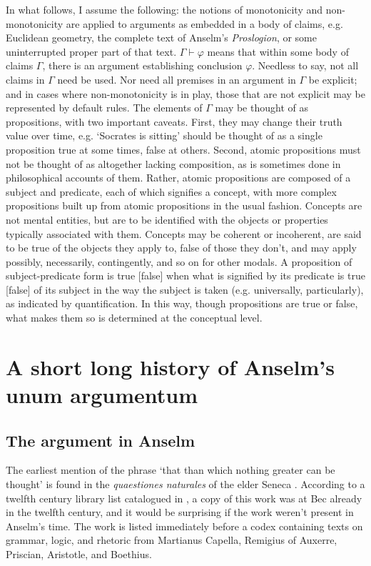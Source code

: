 \documentclass[]{amsart}
\begin{document}
In what follows, I assume the following: the notions of monotonicity and non-monotonicity are applied to arguments as embedded in a body of claims, e.g. Euclidean geometry, the complete text of Anselm's \textit{Proslogion}, or some uninterrupted proper part of that text. $\Gamma \vdash \varphi$ means that within some body of claims $\Gamma$, there is an argument establishing conclusion $\varphi$. Needless to say, not all claims in $\Gamma$ need be used. Nor need all premises in an argument in $\Gamma$ be explicit; and in cases where non-monotonicity is in play, those that are not explicit may be represented by default rules. The elements of $\Gamma$ may be thought of as propositions, with two important caveats. First, they may change their truth value over time, e.g. `Socrates is sitting' should be thought of as a single proposition true at some times, false at others. Second, atomic propositions must not be thought of as altogether lacking composition, as is sometimes done in philosophical accounts of them. Rather, atomic propositions are composed of a subject and predicate, each of which signifies a concept, with more complex propositions built up from atomic propositions in the usual fashion. Concepts are not mental entities, but are to be identified with the objects or properties typically associated with them. Concepts may be coherent or incoherent, are said to be true of the objects they apply to, false of those they don't, and may apply possibly, necessarily, contingently, and so on for other modals. A proposition of subject-predicate form is true [false] when what is signified by its predicate is true [false] of its subject in the way the subject is taken (e.g. universally, particularly), as indicated by quantification. In this way, though propositions are true or false, what makes them so is determined at the conceptual level.
\section{A short long history of Anselm's unum argumentum}
\subsection{The argument in Anselm}
The earliest mention of the phrase `that than which nothing greater can be thought' is found in the \textit{quaestiones naturales} of the elder Seneca \cite{SenecaQN}. According to a twelfth century library list catalogued in \cite[266]{Bekker1885}, a copy of this work was at Bec already in the twelfth century, and it would be surprising if the work weren't present in Anselm's time. The work is listed immediately before a codex containing texts on grammar, logic, and rhetoric from Martianus Capella, Remigius of Auxerre, Priscian, Aristotle, and Boethius.
\end{document}
